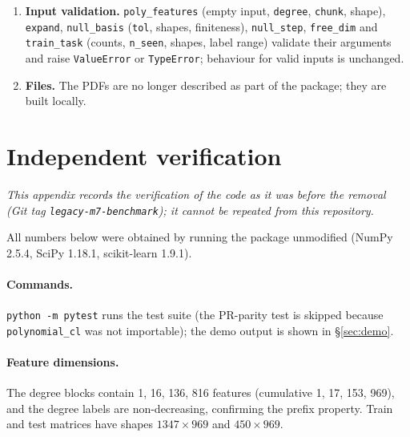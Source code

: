 \documentclass[11pt,a4paper]{article}
\newcommand{\code}[1]{\texttt{#1}}
\begin{document}
\begin{enumerate}
\item \textbf{Input validation.} \code{poly\_features} (empty input, \code{degree}, \code{chunk}, shape), \code{expand}, \code{null\_basis} (\code{tol}, shapes, finiteness), \code{null\_step}, \code{free\_dim} and \code{train\_task} (counts, \code{n\_seen}, shapes, label range) validate their arguments and raise \code{ValueError} or \code{TypeError}; behaviour for valid inputs is unchanged.
\item \textbf{Files.} The PDFs are no longer described as part of the package; they are built locally.
\end{enumerate}

\section{Independent verification}\label{app:verify}

\emph{This appendix records the verification of the code as it was before the removal (Git tag \code{legacy-m7-benchmark}); it cannot be repeated from this repository.}

All numbers below were obtained by running the package unmodified (NumPy 2.5.4, SciPy 1.18.1, scikit-learn 1.9.1).

\paragraph{Commands.} \code{python -m pytest} runs the test suite (the PR-parity test is skipped because \code{polynomial\_cl} was not importable); the demo output is shown in \S\ref{sec:demo}.

\paragraph{Feature dimensions.} The degree blocks contain 1, 16, 136, 816 features (cumulative 1, 17, 153, 969), and the degree labels are non-decreasing, confirming the prefix property. Train and test matrices have shapes $1347\times969$ and $450\times969$.
\end{document}
